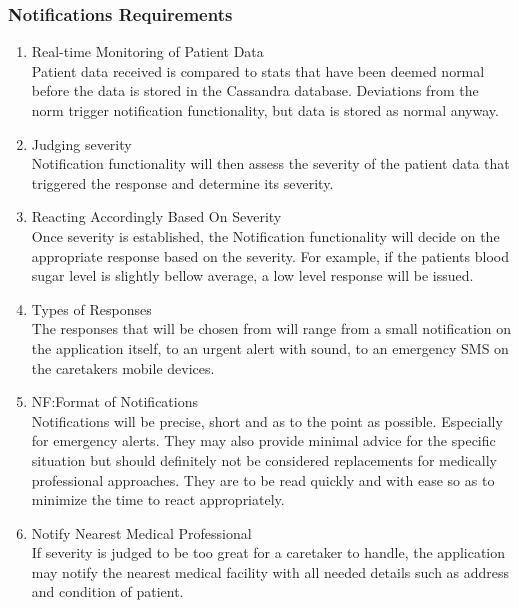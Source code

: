 \subsubsection{Notifications Requirements}
        	\begin{enumerate}
            	\item{Real-time Monitoring of Patient Data\\Patient data received is compared to stats that have been deemed normal before the data is stored in the Cassandra database. Deviations from the norm trigger notification functionality, but data is stored as normal anyway.}
                \item{Judging severity\\Notification functionality will then assess the severity of the patient data that triggered the response and determine its severity.}
                \item{Reacting Accordingly Based On Severity\\ Once severity is established, the Notification functionality will decide on the appropriate response based on the severity. For example, if the patients blood sugar level is slightly bellow average, a low level response will be issued.}
                \item{Types of Responses\\The responses that will be chosen from will range from a small notification on the application itself, to an urgent alert with sound, to an emergency SMS on the caretakers mobile devices.}
                \item{NF:Format of Notifications\\Notifications will be precise, short and as to the point as possible. Especially for emergency alerts. They may also provide minimal advice for the specific situation but should definitely not be considered replacements for medically professional approaches. They are to be read quickly and with ease so as to minimize the time to react appropriately.}
                \item{Notify Nearest Medical Professional\\ If severity is judged to be too great for a caretaker to handle, the application may notify the nearest medical facility with all needed details such as address and condition of patient.}
            \end{enumerate}
